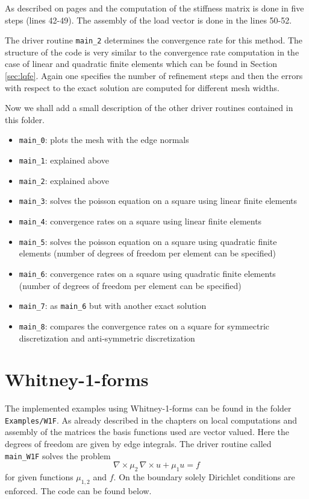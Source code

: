 As described on pages \pageref{ssec:dg} and \pageref{ssec:ddg} the computation of the stiffness matrix is done in five steps (lines 42-49). The assembly of the load vector is done in the lines 50-52.

The driver routine \texttt{main\_2} determines the convergence rate for this method. The structure of the code is very similar to the convergence rate computation in the case of linear and quadratic finite elements which can be found in Section \ref{sec:lqfe}. Again one specifies the number of refinement steps and then the errors with respect to the exact solution are computed for different mesh widths.

Now we shall add a small description of the other driver routines contained in this folder.

\begin{itemize}
 \item \texttt{main\_0}: plots the mesh with the edge normals
 \item \texttt{main\_1}: explained above
 \item \texttt{main\_2}: explained above
 \item \texttt{main\_3}: solves the poisson equation on a square using linear finite elements
 \item \texttt{main\_4}: convergence rates on a square using linear finite elements
 \item \texttt{main\_5}: solves the poisson equation on a square using quadratic finite elements (number of degrees of freedom per element can be specified)
 \item \texttt{main\_6}: convergence rates on a square using quadratic finite elements (number of degrees of freedom per element can be specified)
 \item \texttt{main\_7}: as \texttt{main\_6} but with another exact solution
 \item \texttt{main\_8}: compares the convergence rates on a square for symmectric discretization and anti-symmetric discretization
\end{itemize}




\section{Whitney-1-forms}

The implemented examples using Whitney-1-forms can be found in the folder \texttt{Examples/W1F}. As already described in the chapters on local computations and assembly of the matrices the basis functions used are vector valued. Here the degrees of freedom are given by edge integrals. The driver routine called \texttt{main\_W1F} solves the problem
\begin{equation} \label{eq:ccurl}
 \nabla \times \mu_2 \, \nabla \times u + \mu_1 u = f
\end{equation}
for given functions $\mu_{1,2}$ and $f$. On the boundary solely Dirichlet conditions are enforced. The code can be found below.

